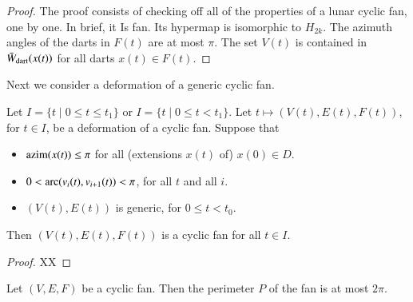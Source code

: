 \begin{proof}  The proof consists of checking off all of the properties of a lunar cyclic fan, one by one.  In brief, it Is fan.  Its hypermap is isomorphic to $H_{2k}$.  The azimuth angles of the darts in $F(t)$ are at most $\pi$.  The set $V(t)$ is contained in $\bar W_{\text{dart}}(x(t))$ for all darts $x(t)\in F(t)$.
\end{proof}

Next we consider a deformation of a generic cyclic fan.



\begin{lemma} Let $I = \{t\mid 0\le t\le t_1\}$ or $I=\{t\mid 0\le t < t_1\}$.  Let $t\mapsto (V(t),E(t),F(t))$, for $t\in I$, be a deformation of a cyclic fan.  Suppose that 
\begin{itemize} 
\item ${\operatorname{azim}}(x(t))\le \pi$ for all (extensions $x(t)$ of) $x(0)\in D$.
\item $0 < \operatorname{arc}(v_i(t),v_{i+1}(t)) < \pi$, for all $t$ and all $i$.
\item $(V(t),E(t))$ is generic, for $0\le t<t_0$.
\end{itemize}
Then $(V(t),E(t),F(t))$ is a cyclic fan for all $t\in I$.
\end{lemma}

\begin{proof}
XX
\end{proof}






\begin{lemma}
Let $(V,E,F)$ be a cyclic fan.  Then the perimeter $P$ of the fan is at most $2\pi$.
\end{lemma}

